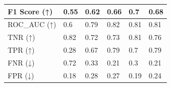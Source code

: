 \documentclass[conference]{IEEEtran}
\begin{document}
\begin{table}[htbp]
\begin{tabular}{|l|l|l|l|l|l|}
F1 Score (↑)  & 0.55                                                  & 0.62                                                                    & 0.66                                                                 & 0.7                                                                          & 0.68                                                                      \\ \hline
ROC\_AUC (↑)  & 0.6                                                   & 0.79                                                                    & 0.82                                                                 & 0.81                                                                         & 0.81                                                                      \\ \hline
TNR (↑)       & 0.82                                                  & 0.72                                                                    & 0.73                                                                 & 0.81                                                                         & 0.76                                                                      \\ \hline
TPR   (↑)     & 0.28                                                  & 0.67                                                                    & 0.79                                                                 & 0.7                                                                          & 0.79                                                                      \\ \hline
FNR   (↓)     & 0.72                                                  & 0.33                                                                    & 0.21                                                                 & 0.3                                                                          & 0.21                                                                      \\ \hline
FPR (↓)       & 0.18                                                  & 0.28                                                                    & 0.27                                                                 & 0.19                                                                         & 0.24                                                                      \\ \hline
\end{tabular}

\label{tab:results}
\end{table}
\end{document}

